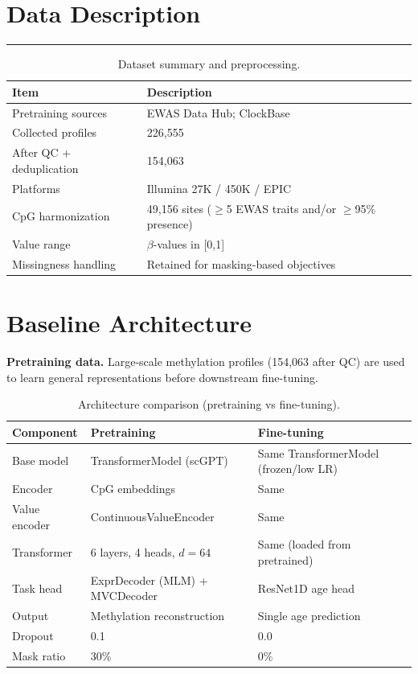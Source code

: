 \documentclass[11pt]{article}
\begin{document}
\section{Data Description}
\vspace{-0.3em}
\hrule
\vspace{0.8em}
\begin{table}[h]
\centering
\caption{Dataset summary and preprocessing.}
\label{tab:data}
\begin{tabular}{ll}
\toprule
Item & Description \\
\midrule
Pretraining sources & EWAS Data Hub; ClockBase \\
Collected profiles & 226,555 \\
After QC + deduplication & 154,063 \\
Platforms & Illumina 27K / 450K / EPIC \\
CpG harmonization & 49,156 sites ($\geq$5 EWAS traits and/or $\geq$95\% presence) \\
Value range & $\beta$-values in [0,1] \\
Missingness handling & Retained for masking-based objectives \\
\bottomrule
\end{tabular}
\end{table}

\section{Baseline Architecture}
\textbf{Pretraining data.} Large-scale methylation profiles (154,063 after QC) are used to learn general representations before downstream fine-tuning.

\begin{table}[h]
\centering
\caption{Architecture comparison (pretraining vs fine-tuning).}
\label{tab:arch_compare}
\begin{tabular}{lll}
\toprule
Component & Pretraining & Fine-tuning \\
\midrule
Base model & TransformerModel (scGPT) & Same TransformerModel (frozen/low LR) \\
Encoder & CpG embeddings & Same \\
Value encoder & ContinuousValueEncoder & Same \\
Transformer & 6 layers, 4 heads, $d=64$ & Same (loaded from pretrained) \\
Task head & ExprDecoder (MLM) + MVCDecoder & ResNet1D age head  \\
Output & Methylation reconstruction & Single age prediction \\
Dropout & 0.1 & 0.0 \\
Mask ratio & 30\% & 0\% \\
\bottomrule
\end{tabular}
\end{table}
\end{document}
